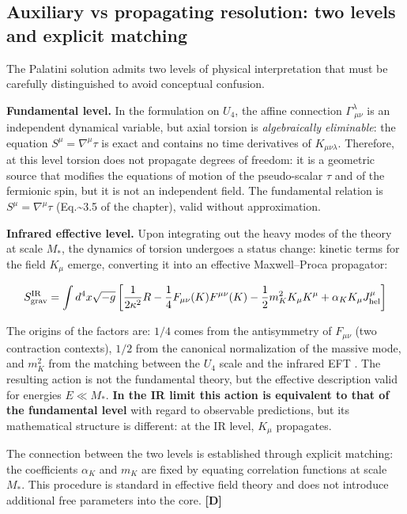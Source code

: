 ﻿\documentclass[11pt,letterpaper]{article}
\begin{document}
\subsection{Auxiliary vs propagating resolution: two levels and explicit matching}
The Palatini solution admits two levels of physical interpretation that must be carefully distinguished to avoid conceptual confusion.

\textbf{Fundamental level.} In the formulation on $U_4$, the affine connection $\Gamma^\lambda_{\ \mu\nu}$ is an independent dynamical variable, but axial torsion is \emph{algebraically eliminable}: the equation $S^\mu = \nabla^\mu\tau$ is exact and contains no time derivatives of $K_{\mu\nu\lambda}$. Therefore, at this level torsion does not propagate degrees of freedom: it is a geometric source that modifies the equations of motion of the pseudo-scalar $\tau$ and of the fermionic spin, but it is not an independent field. The fundamental relation is $S^\mu = \nabla^\mu\tau$ (Eq.\textasciitilde{}3.5 of the chapter), valid without approximation.

\textbf{Infrared effective level.} Upon integrating out the heavy modes of the theory at scale $M_*$, the dynamics of torsion undergoes a status change: kinetic terms for the field $K_\mu$ emerge, converting it into an effective Maxwell--Proca propagator:

\begin{equation*}
  \resizebox{\ifdim\width>\linewidth \linewidth\else\width\fi}{!}{$\displaystyle S_{\text{grav}}^{\text{IR}} = \int d^4x\sqrt{-g}\left[\frac{1}{2\kappa^2}R - \frac{1}{4}F_{\mu\nu}(K)F^{\mu\nu}(K) - \frac{1}{2}m_K^2 K_\mu K^\mu + \alpha_K K_\mu J_{\text{hel}}^\mu\right]$}
\end{equation*}

The origins of the factors are: $1/4$ comes from the antisymmetry of $F_{\mu\nu}$ (two contraction contexts), $1/2$ from the canonical normalization of the massive mode, and $m_K^2$ from the matching between the $U_4$ scale and the infrared EFT \cite{Tomboulis2015}. The resulting action is not the fundamental theory, but the effective description valid for energies $E \ll M_*$. \textbf{In the IR limit this action is equivalent to that of the fundamental level} with regard to observable predictions, but its mathematical structure is different: at the IR level, $K_\mu$ propagates.

The connection between the two levels is established through explicit matching: the coefficients $\alpha_K$ and $m_K$ are fixed by equating correlation functions at scale $M_*$. This procedure is standard in effective field theory and does not introduce additional free parameters into the core. \textbf{[D]}
\end{document}
